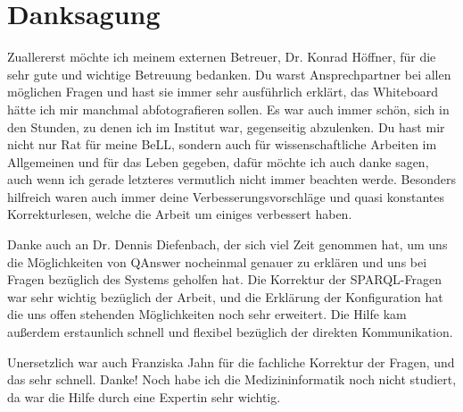 


\bigskip

\begingroup
\let\clearpage\relax
\let\cleardoublepage\relax
\let\cleardoublepage\relax
\chapter*{Danksagung}

Zuallererst möchte ich meinem externen Betreuer, Dr. Konrad Höffner, für die sehr gute und wichtige Betreuung bedanken.
Du warst Ansprechpartner bei allen möglichen Fragen und hast sie immer sehr ausführlich erklärt, das Whiteboard hätte ich mir manchmal abfotografieren sollen.
Es war auch immer schön, sich in den Stunden, zu denen ich im Institut war, gegenseitig abzulenken.
Du hast mir nicht nur Rat für meine BeLL, sondern auch für wissenschaftliche Arbeiten im Allgemeinen und für das Leben gegeben, dafür möchte ich auch danke sagen, auch wenn ich gerade letzteres vermutlich nicht immer beachten werde.
Besonders hilfreich waren auch immer deine Verbesserungsvorschläge und quasi konstantes Korrekturlesen, welche die Arbeit um einiges verbessert haben.

Danke auch an Dr. Dennis Diefenbach, der sich viel Zeit genommen hat, um uns die Möglichkeiten von QAnswer nocheinmal genauer zu erklären und uns bei Fragen bezüglich des Systems geholfen hat.
Die Korrektur der SPARQL-Fragen war sehr wichtig bezüglich der Arbeit, und die Erklärung der Konfiguration hat die uns offen stehenden Möglichkeiten noch sehr erweitert.
Die Hilfe kam außerdem erstaunlich schnell und flexibel bezüglich der direkten Kommunikation.

Unersetzlich war auch Franziska Jahn für die fachliche Korrektur der Fragen, und das sehr schnell.
Danke!
Noch habe ich die Medizininformatik noch nicht studiert, da war die Hilfe durch eine Expertin sehr wichtig.

